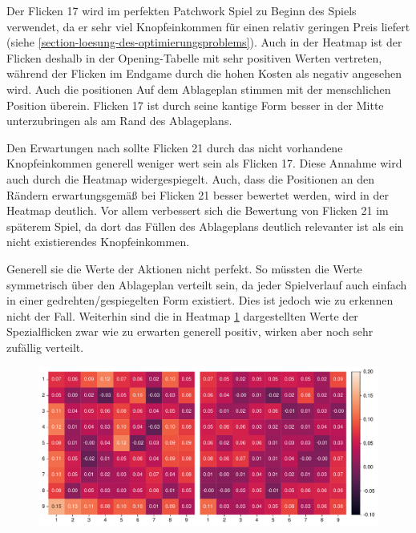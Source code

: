 \vspace*{-0.14cm}

Der Flicken 17 wird im perfekten Patchwork Spiel zu Beginn des Spiels verwendet, da er sehr viel Knopfeinkommen für einen relativ geringen Preis liefert (siehe \ref{section-loesung-des-optimierungsproblems}). Auch in der Heatmap ist der Flicken deshalb in der Opening-Tabelle mit sehr positiven Werten vertreten, während der Flicken im Endgame durch die hohen Kosten als negativ angesehen wird. Auch die positionen Auf dem Ablageplan stimmen mit der menschlichen Position überein. Flicken 17 ist durch seine kantige Form besser in der Mitte unterzubringen als am Rand des Ablageplans.

Den Erwartungen nach sollte Flicken 21 durch das nicht vorhandene Knopfeinkommen generell weniger wert sein als Flicken 17. Diese Annahme wird auch durch die Heatmap widergespiegelt. Auch, dass die Positionen an den Rändern erwartungsgemäß bei Flicken 21 besser bewertet werden, wird in der Heatmap deutlich. Vor allem verbessert sich die Bewertung von Flicken 21 im späterem Spiel, da dort das Füllen des Ablageplans deutlich relevanter ist als ein nicht existierendes Knopfeinkommen.

Generell sie die Werte der Aktionen nicht perfekt. So müssten die Werte symmetrisch über den Ablageplan verteilt sein, da jeder Spielverlauf auch einfach in einer gedrehten/gespiegelten Form existiert. Dies ist jedoch wie zu erkennen nicht der Fall. Weiterhin sind die in Heatmap \ref{fig:action-ordering-special-patch} dargestellten Werte der Spezialflicken zwar wie zu erwarten generell positiv, wirken aber noch sehr zufällig verteilt.

\begin{figure}[!ht]
    \centering
    \begin{minipage}{.78\textwidth}
        \centering
        \includegraphics[width=\linewidth]{res/pictures/plots/special-action-ordering.pdf}
    \end{minipage}
    \label{fig:action-ordering-special-patch}
\end{figure}

